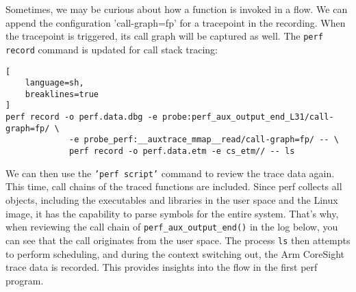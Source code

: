 \documentclass[11pt]{diazessay} %
\def\code#1{\texttt{#1}}
\begin{document}
Sometimes, we may be curious about how a function is invoked in a flow. We can
append the configuration 'call-graph=fp' for a tracepoint in the recording.
When the tracepoint is triggered, its call graph will be captured as well.
The \code{perf record} command is updated for call stack tracing:

\begin{lstlisting}[
  	language=sh,
	breaklines=true
]
perf record -o perf.data.dbg -e probe:perf_aux_output_end_L31/call-graph=fp/ \
             -e probe_perf:__auxtrace_mmap__read/call-graph=fp/ -- \
             perf record -o perf.data.etm -e cs_etm// -- ls
\end{lstlisting}

We can then use the \code{'perf script'} command to review the trace data
again. This time, call chains of the traced functions are included. Since perf
collects all objects, including the executables and libraries in the user
space and the Linux image, it has the capability to parse symbols for the
entire system. That's why, when reviewing the call chain of
\code{perf\_aux\_output\_end()} in the log below, you can see that the call
originates from the user space. The process \code{ls} then attempts to
perform scheduling, and during the context switching out, the Arm CoreSight
trace data is recorded. This provides insights into the flow in the first
perf program.
\end{document}
